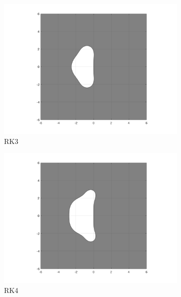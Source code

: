 \documentclass[10pt]{report}
\begin{document}
\begin{enumerate}
\begin{figure}[ht]
\begin{subfigure}[b]{0.25\linewidth}
			\centering
			\includegraphics[width=\linewidth]{RK3.png} 
			\vspace{-5ex}
			\caption*{RK3}
		\end{subfigure}%
		\begin{subfigure}[b]{0.25\linewidth}
			\centering
			\includegraphics[width=\linewidth]{RK4.png} 
			\vspace{-5ex}
			\caption*{RK4}
		\end{subfigure}\\
		\begin{subfigure}[b]{0.25\linewidth}
			\centering

\end{subfigure}
\end{figure}
\end{enumerate}
\end{document}
